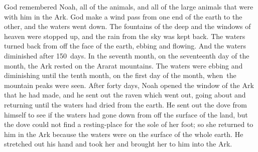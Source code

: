 
\begin{inparaenum}
     God remembered Noah, all of the animals, and all of the large animals that were with him in the Ark. God make a wind pass from one end of the earth to the other, and the waters went down.%
     The fountains of the deep and the windows of heaven were stopped up, and the rain from the sky was kept back.%
     The waters turned back from off the face of the earth, ebbing and flowing. And the waters diminished after 150~days.%
     In the seventh month, on the seventeenth day of the month, the Ark rested on the Ararat mountains.%
     The waters were ebbing and diminishing until the tenth month, on the first day of the month, when\understood\ the mountain peaks were seen.%
     After forty days, Noah opened the window of the Ark that he had made,%
     and he sent out the raven which went out, going about and returning until the waters had dried from the earth.%
     He sent out the dove from himself to see if the waters had gone down from off the surface of the land,%
     but the dove could not find a resting-place for the sole of her foot; so she returned to him in the Ark because the waters were on the surface of the whole earth. He stretched out his hand and took her and brought her to him into the Ark.%
    
    
\end{inparaenum}
